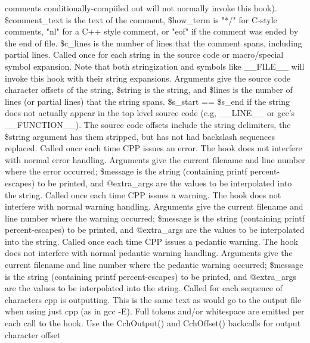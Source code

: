 comments conditionally-compiiled out will not normally invoke this hook).
\$comment\_\-text is the text of the comment, \$how\_\-term is "*/" for C-style
comments, "nl" for a C++ style comment, or "eof" if the comment
was ended by the end of file.
\$c\_\-lines is the number of lines that the comment spans, including partial lines.
Called once for each string in the source code or macro/special symbol expansion.
Note that both stringization and symbols like \_\-\_\-FILE\_\-\_\- will invoke this hook
with their string expansions.
Arguments give the source code character offsets of the string, \$string is
the string, and \$lines is the number of lines (or partial lines) that the
string spans.  \$s\_\-start == \$s\_\-end if the string does not actually appear
in the top level source code (e.g, \_\-\_\-LINE\_\-\_\- or gcc's \_\-\_\-FUNCTION\_\-\_\-).
The source code offsets include the string delimiters, the \$string argument
has them stripped, but has not had backslash sequences replaced.
Called once each time CPP issues an error.  The hook does not interfere
with normal error handling.  Arguments give the current filename and line
number where the error occurred;  \$message is the string (containing printf
percent-escapes) to be printed, and @extra\_\-args are the values to be 
interpolated into the string.
Called once each time CPP issues a warning.  The hook does not interfere
with normal warning handling.  Arguments give the current filename and line
number where the warning occurred;  \$message is the string (containing printf
percent-escapes) to be printed, and @extra\_\-args are the values to be 
interpolated into the string.
Called once each time CPP issues a pedantic warning.  The hook does not interfere
with normal pedantic warning handling.  Arguments give the current filename and line
number where the pedantic warning occurred;  \$message is the string (containing printf
percent-escapes) to be printed, and @extra\_\-args are the values to be 
interpolated into the string.
Called for each sequence of characters cpp is outputting.  This is the
same text as would go to the output file when using just cpp (as in gcc -E).
Full tokens and/or whitespace are emitted per each call to the hook.
Use the CchOutput() and CchOffset() backcalls for output character offset
